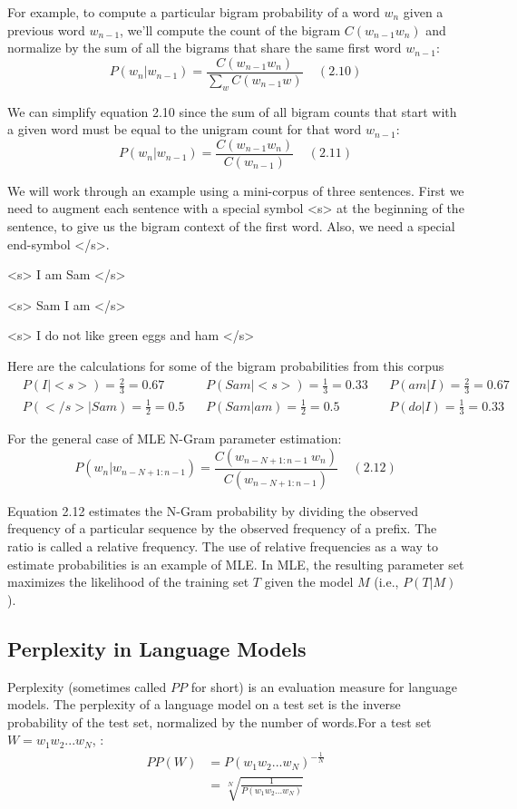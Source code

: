 For example, to compute a particular bigram probability of a word $w_n$ given a previous word $w_{n-1}$, we'll compute the count of the bigram $C(w_{n-1}w_n)$ and normalize by the sum of all the bigrams that share the same first word $w_{n-1}$:
$$
	P(w_n|w_{n-1}) = \frac{C(w_{n-1}w_n)}{\sum_w C(w_{n-1}w)}\ \ \ \ \ (2.10)
$$

We can simplify equation 2.10 since the sum of all bigram counts that start with a given word must be equal to the unigram count for that word $w_{n-1}$:
$$
	P(w_n|w_{n-1}) = \frac{C(w_{n-1}w_n)}{C(w_{n-1})}\ \ \ \ \ (2.11)
$$

We will work through an example using a mini-corpus of three sentences. First we need to augment each sentence with a special symbol <s> at the beginning of the sentence, to give us the bigram context of the first word. Also, we need a special end-symbol </s>.

<s> I am Sam </s>

<s> Sam I am </s>

<s> I do not like green eggs and ham </s>

Here are the calculations for some of the bigram probabilities from this corpus
$$	\begin{aligned}
		&P(I|<s>) = \frac{2}{3} = 0.67\ \ \ \ &P(Sam|<s>) = \frac{1}{3} = 0.33 \ \ \ \ &P(am|I) = \frac{2}{3} = 0.67\\
		&P(</s>|Sam) = \frac{1}{2} = 0.5\ \ \ \ &P(Sam|am) = \frac{1}{2} = 0.5\ \ \ \ &P(do|I) = \frac{1}{3} = 0.33
	\end{aligned}
$$

For the general case of MLE N-Gram parameter estimation:
$$
	P(w_n|w_{n-N+1:n-1}) = \frac{C(w_{n-N+1:n-1}\ w_n)}{C(w_{n-N+1:n-1})}\ \ \ \ \ (2.12)
$$

Equation 2.12 estimates the N-Gram probability by dividing the observed frequency of a particular sequence by the observed frequency of a prefix. The ratio is called a relative frequency. The use of relative frequencies as a way to estimate probabilities is an example of MLE. In MLE, the resulting parameter set maximizes the likelihood of the training set $T$ given the model $M$ (i.e., $P(T|M)$). 
\subsection{Perplexity in Language Models}
Perplexity (sometimes called $PP$ for short) is an evaluation measure for language models. The perplexity of a language model on a test set is the inverse probability of the test set, normalized by the number of words.For a test set $W=w_1w_2...w_N$, :
$$	\begin{aligned}
		PP(W)&=P(w_1w_2...w_N)^{-\frac{1}{N}}\\
		&=\sqrt[N]{\frac{1}{P(w_1w_2...w_N)}}
	\end{aligned}
$$


